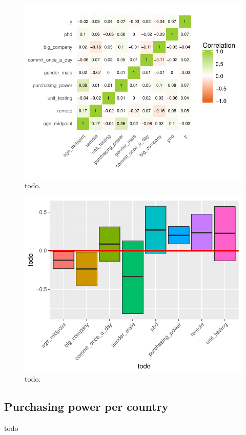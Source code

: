 \documentclass{article}
\begin{document}
\begin{figure}[H]
\centering
\includegraphics{report-019}
\caption{todo.}\label{fig_4}
\end{figure}


\begin{figure}[H]
\centering
\includegraphics{report-021}
\caption{todo.}\label{fig_5}
\end{figure}

\subsection{Purchasing power per country}
todo
\end{document}
